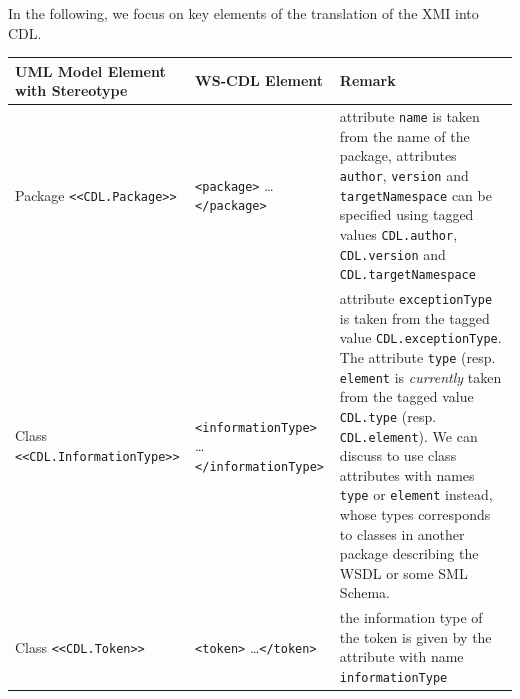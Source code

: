 \documentclass[pdftex]{scrartcl}
\newcommand{\st}[1]{\texttt{<<#1>>}}
\newcommand{\xml}[1]{\texttt{<#1>} \ldots \texttt{</#1>}}
\begin{document}
In the following, we focus on key elements of the translation of
the XMI into CDL.

\begin{longtable}{p{5cm}|p{4.5cm}|p{5.5cm}}
  \textbf{UML Model Element with Stereotype}& \textbf{WS-CDL Element} & 
  \textbf{Remark} \\\hline\hline
  Package            \st{CDL.Package}       & \xml{package}          &
  attribute \texttt{name} is taken from the name of the package, 
  attributes \texttt{author}, \texttt{version} and
  \texttt{targetNamespace} can be specified using tagged values
  \texttt{CDL.author}, \texttt{CDL.version} and
  \texttt{CDL.targetNamespace}  \\\hline 
  Class              \st{CDL.InformationType}  & \xml{informationType}  &
  attribute \texttt{exceptionType} is taken from the tagged value
    \texttt{CDL.exceptionType}. The attribute \texttt{type}
    (resp. \texttt{element} is \emph{currently} taken from the tagged
    value \texttt{CDL.type} (resp. \texttt{CDL.element}).  We can
    discuss to use class attributes with names \texttt{type} or
    \texttt{element} instead, whose types corresponds to classes in
    another package describing the WSDL or some SML Schema.  
  \\\hline
  Class              \st{CDL.Token}            & \xml{token}
  & the information type of the token is given by the attribute with
  name \texttt{informationType}\\
  

\end{longtable}
\end{document}
